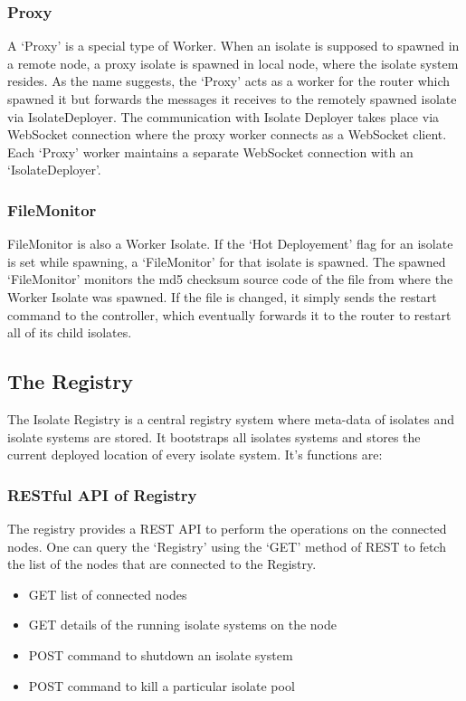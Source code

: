   \subsubsection{Proxy}
  A ‘Proxy’ is a special type of Worker. When an isolate is supposed to spawned in a remote node, a proxy isolate is spawned in local node, where the isolate system resides. As the name suggests, the ‘Proxy’ acts as a worker for the router which spawned it but forwards the messages it receives to the remotely spawned isolate via IsolateDeployer. The communication with Isolate Deployer takes place via WebSocket connection where the proxy worker connects as a WebSocket client. Each ‘Proxy’ worker maintains a separate WebSocket connection with an ‘IsolateDeployer’.

  \subsubsection{FileMonitor}
  FileMonitor is also a Worker Isolate. If the ‘Hot Deployement’ flag for an isolate is set while spawning, a ‘FileMonitor’ for that isolate is spawned. The spawned ‘FileMonitor’ monitors the md5 checksum source code of the file from where the Worker Isolate was spawned. If the file is changed, it simply sends the restart command to the controller, which eventually forwards it to the router to restart all of its child isolates.


\subsection{The Registry}
The Isolate Registry is a central registry system where meta-data of isolates and isolate systems are stored. It bootstraps all isolates systems and stores the current deployed location of every isolate system. It’s functions are:
  \subsubsection{RESTful API of Registry}
  The registry provides a REST API to perform the operations on the connected nodes. One can query the ‘Registry’ using the ‘GET’ method of REST to fetch the list of the nodes that are connected to the Registry.
  \begin{itemize}
  \item GET list of connected nodes
  \item GET details of the running isolate systems on the node
  \item POST command to shutdown an isolate system
  \item POST command to kill a particular isolate pool
  \end{itemize}

